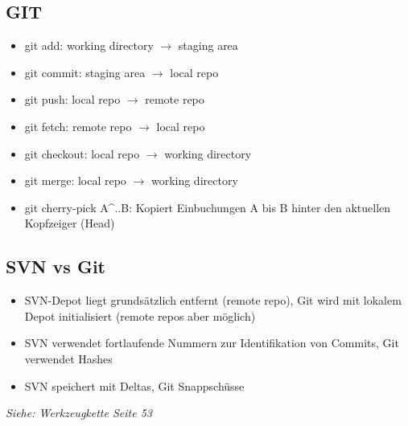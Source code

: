 \subsection{GIT}
\begin{itemize}
    \item git add: working directory $\rightarrow$ staging area
    \item git commit: staging area $\rightarrow$ local repo
    \item git push: local repo $\rightarrow$ remote repo
    \item git fetch: remote repo $\rightarrow$ local repo
    \item git checkout: local repo $\rightarrow$ working directory
    \item git merge: local repo $\rightarrow$ working directory
    \item git cherry-pick A\textasciicircum ..B: Kopiert Einbuchungen A bis B hinter den aktuellen Kopfzeiger (Head)
\end{itemize}




\subsection{SVN vs Git}
\begin{itemize}
    \item SVN-Depot liegt grundsätzlich entfernt (remote repo), Git wird mit lokalem Depot initialisiert (remote repos aber möglich)
    \item SVN verwendet fortlaufende Nummern zur Identifikation von Commits, Git verwendet Hashes
    \item SVN speichert mit Deltas, Git Snappschüsse
\end{itemize}

\textit{Siehe: Werkzeugkette Seite 53}
